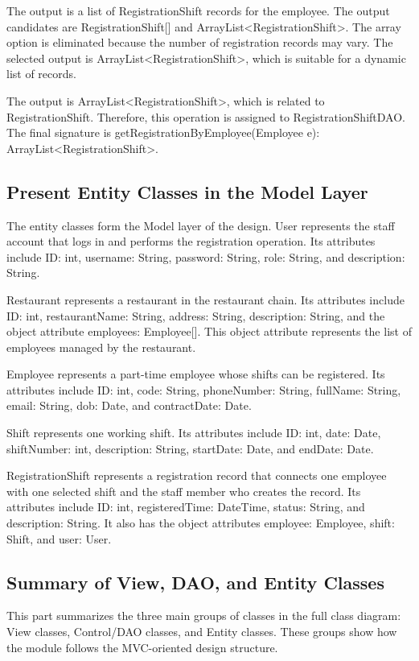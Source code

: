 The output is a list of RegistrationShift records for the employee. The output candidates are RegistrationShift[] and ArrayList<RegistrationShift>. The array option is eliminated because the number of registration records may vary. The selected output is ArrayList<RegistrationShift>, which is suitable for a dynamic list of records.

The output is ArrayList<RegistrationShift>, which is related to RegistrationShift. Therefore, this operation is assigned to RegistrationShiftDAO. The final signature is getRegistrationByEmployee(Employee e): ArrayList<RegistrationShift>.

\subsection{Present Entity Classes in the Model Layer}

The entity classes form the Model layer of the design. User represents the staff account that logs in and performs the registration operation. Its attributes include ID: int, username: String, password: String, role: String, and description: String.

Restaurant represents a restaurant in the restaurant chain. Its attributes include ID: int, restaurantName: String, address: String, description: String, and the object attribute employees: Employee[]. This object attribute represents the list of employees managed by the restaurant.

Employee represents a part-time employee whose shifts can be registered. Its attributes include ID: int, code: String, phoneNumber: String, fullName: String, email: String, dob: Date, and contractDate: Date.

Shift represents one working shift. Its attributes include ID: int, date: Date, shiftNumber: int, description: String, startDate: Date, and endDate: Date.

RegistrationShift represents a registration record that connects one employee with one selected shift and the staff member who creates the record. Its attributes include ID: int, registeredTime: DateTime, status: String, and description: String. It also has the object attributes employee: Employee, shift: Shift, and user: User.

\subsection{Summary of View, DAO, and Entity Classes}

This part summarizes the three main groups of classes in the full class diagram: View classes, Control/DAO classes, and Entity classes. These groups show how the module follows the MVC-oriented design structure.

